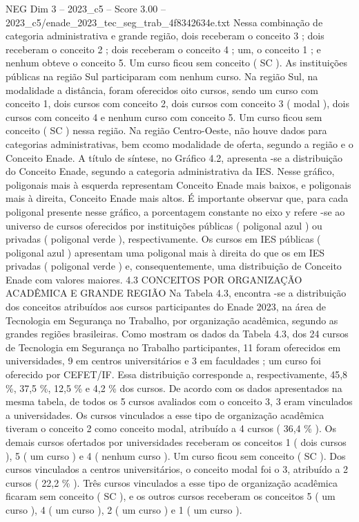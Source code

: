 \begin{textsample}{NEG Dim 3 – 2023\_c5 – Score 3.00 – 2023\_c5/enade\_2023\_tec\_seg\_trab\_4f8342634e.txt}
Nessa combinação de categoria administrativa e grande região, dois receberam o conceito 3 ; dois receberam o conceito 2 ; dois receberam o conceito 4 ; um, o conceito 1 ; e nenhum obteve o conceito 5.
Um curso ficou sem conceito ( SC ).
As instituições públicas na região Sul participaram com nenhum curso.
Na região Sul, na modalidade a distância, foram oferecidos oito cursos, sendo um curso com conceito 1, dois cursos com conceito 2, dois cursos com conceito 3 ( modal ), dois cursos com conceito 4 e nenhum curso com conceito 5.
Um curso ficou sem conceito ( SC ) nessa região.
Na região Centro-Oeste, não houve dados para categorias administrativas, bem ccomo modalidade de oferta, segundo a região e o Conceito Enade.
A título de síntese, no Gráfico 4.2, apresenta -se a distribuição do Conceito Enade, segundo a categoria administrativa da IES.
Nesse gráfico, poligonais mais à esquerda representam Conceito Enade mais baixos, e poligonais mais à direita, Conceito Enade mais altos.
É importante observar que, para cada poligonal presente nesse gráfico, a porcentagem constante no eixo y refere -se ao universo de cursos oferecidos por instituições públicas ( poligonal azul ) ou privadas ( poligonal verde ), respectivamente.
Os cursos em IES públicas ( poligonal azul ) apresentam uma poligonal mais à direita do que os em IES privadas ( poligonal verde ) e, consequentemente, uma distribuição de Conceito Enade com valores maiores. 4.3 CONCEITOS POR ORGANIZAÇÃO ACADÊMICA E GRANDE REGIÃO Na Tabela 4.3, encontra -se a distribuição dos conceitos atribuídos aos cursos participantes do Enade 2023, na área de Tecnologia em Segurança no Trabalho, por organização acadêmica, segundo as grandes regiões brasileiras.
Como mostram os dados da Tabela 4.3, dos 24 cursos de Tecnologia em Segurança no Trabalho participantes, 11 foram oferecidos em universidades, 9 em centros universitários e 3 em faculdades ; um curso foi oferecido por CEFET/IF.
Essa distribuição corresponde a, respectivamente, 45,8 \%, 37,5 \%, 12,5 \% e 4,2 \% dos cursos.
De acordo com os dados apresentados na mesma tabela, de todos os 5 cursos avaliados com o conceito 3, 3 eram vinculados a universidades.
Os cursos vinculados a esse tipo de organização acadêmica tiveram o conceito 2 como conceito modal, atribuído a 4 cursos ( 36,4 \% ).
Os demais cursos ofertados por universidades receberam os conceitos 1 ( dois cursos ), 5 ( um curso ) e 4 ( nenhum curso ).
Um curso ficou sem conceito ( SC ).
Dos cursos vinculados a centros universitários, o conceito modal foi o 3, atribuído a 2 cursos ( 22,2 \% ).
Três cursos vinculados a esse tipo de organização acadêmica ficaram sem conceito ( SC ), e os outros cursos receberam os conceitos 5 ( um curso ), 4 ( um curso ), 2 ( um curso ) e 1 ( um curso ).

\end{textsample}

